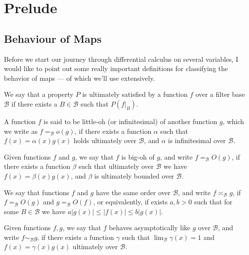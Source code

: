 \section{Prelude}

\subsection{Behaviour of Maps}

Before we start our journey through differential calculus on several variables,
I would like to point out some really important definitions for classifying the
behavior of maps --- of which we'll use extensively.

\begin{definition}[Ultimately]
  We say that a property \(P\) is ultimately satisfied by a function \(f\) over
  a filter base \(\mathcal B\) if there exists a \(B \in \mathcal B\) such that
  \(P(f|_B)\).
\end{definition}

\begin{definition}[Little-oh]\label{def: little oh}
  A function \(f\) is said to be little-oh (or infinitesimal) of another
  function \(g\), which we write as \(f =_{\mathcal B} o(g)\), if there exists
  a function \(\alpha\) such that \(f(x) = \alpha(x) g(x)\) holds ultimately
  over \(\mathcal B\), and \(\alpha\) is infinitesimal over \(\mathcal B\).
\end{definition}

\begin{definition}[Big-oh]\label{def: big oh}
  Given functions \(f\) and \(g\), we say that \(f\) is big-oh of \(g\), and
  write \(f =_{\mathcal B} O(g)\), if there exists a function \(\beta\) such
  that ultimately over \(\mathcal B\) we have \(f(x) = \beta(x) g(x)\), and
  \(\beta\) is ultimately bounded over \(\mathcal B\).
\end{definition}

\begin{definition}\label{def: asymp-order}
  We say that functions \(f\) and \(g\) have the same order over \(\mathcal
  B\), and write \(f \asymp_{\mathcal B} g\), if \(f =_{\mathcal B} O(g)\) and
  \(g =_{\mathcal B} O(f)\), or equivalently, if exists \(a, b > 0\) such that
  for some \(B \in \mathcal B\) we have \(a |g(x)| \leq |f(x)| \leq b|g(x)|\).
\end{definition}

\begin{definition}
  Given functions \(f, g\), we say that \(f\) behaves asymptotically like \(g\)
  over \(\mathcal B\), and write \(f \sim_{\mathcal B} g\), if there exists a
  function \(\gamma\) such that \(\lim_{\mathcal B} \gamma(x) = 1\) and \(f(x) =
  \gamma(x) g(x)\) ultimately over \(\mathcal B\).
\end{definition}

